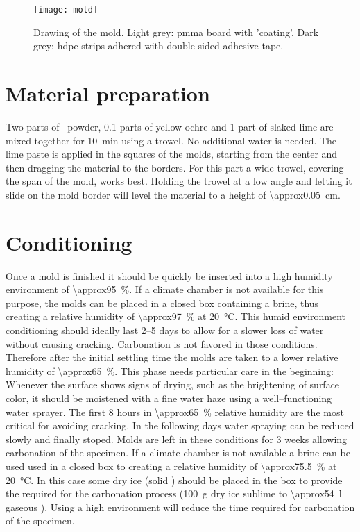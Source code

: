 \documentclass[review]{elsarticle}
\begin{document}
\begin{figure}[htb]
\centering
\texttt{[image: mold]}
\caption{Drawing of the mold. Light grey: \gls{pmma} board with 'coating'. Dark grey: \gls{hdpe} strips adhered with double sided adhesive tape.}
\label{fig:mold}
\end{figure}

\section{Material preparation}

Two parts of --powder,
0.1 parts of yellow ochre and 1 part of slaked lime are mixed together for \SI{10}{\minute} using a trowel.
No additional water is needed.
The lime paste is applied in the squares of the molds, starting from the center and then dragging the material to the borders.
For this part a wide trowel, covering the span of the mold, works best.
Holding the trowel at a low angle and letting it slide on the mold border will level the material to a height of \SI{\approx0.05}{\cm}.


\section{Conditioning}

Once a mold is finished it should be quickly be inserted into a high humidity environment of \SI{\approx95}{\percent}.
If a climate chamber is not available for this purpose, the molds can be placed in a closed box containing a  brine, thus creating a relative humidity of \SI{\approx97}{\percent} at \SI{20}{\celsius}.
This humid environment conditioning should ideally last 2--5 days to allow for a slower loss of water without causing cracking.
Carbonation is not favored in those conditions.
Therefore after the initial settling time the molds are taken to a lower relative humidity of \SI{\approx65}{\percent}.
This phase needs particular care in the beginning:
Whenever the surface shows signs of drying, such as the brightening of surface color, it should be moistened with a fine water haze using a well--functioning water sprayer.
The first 8 hours in \SI{\approx65}{\percent} relative humidity are the most critical for avoiding cracking.
In the following days water spraying can be reduced slowly and finally stoped.
Molds are left in these conditions for 3 weeks allowing carbonation of the specimen.
If a climate chamber is not available a  brine can be used used in a closed box to creating a relative humidity of \SI{\approx75.5}{\percent} at \SI{20}{\celsius}.
In this case some dry ice (solid ) should be placed in the box to provide the required  for the carbonation process (\SI{100}{\g} dry ice sublime to \SI{\approx54}{\l} gaseous ).
Using a high  environment will reduce the time required for carbonation of the specimen.
\end{document}
